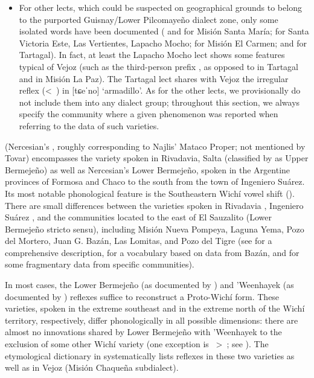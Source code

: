 \begin{itemize}
    \item For other lects, which could be suspected on geographical grounds to belong to the purported Guisnay/Lower Pilcomayeño dialect zone, only some isolated words have been documented ( and  for Misión Santa María;  for Santa Victoria Este, Las Vertientes, Lapacho Mocho;  for Misión El Carmen;  and  for Tartagal). In fact, at least the Lapacho Mocho lect shows some features typical of Vejoz (such as the third-person prefix , as opposed to  in Tartagal and  in Misión La Paz). The Tartagal lect shares with Vejoz the irregular reflex  (<~) in [tɕeˈno] `armadillo'. As for the other lects, we provisionally do not include them into any dialect group; throughout this section, we always specify the community where a given phenomenon was reported when referring to the data of such varieties.
\end{itemize}

 (Nercesian’s , roughly corresponding to Najlis’ Mataco Proper; not mentioned by Tovar) encompasses the variety spoken in Rivadavia, Salta (classified by  as Upper Bermejeño) as well as Nercesian’s Lower Bermejeño, spoken in the Argentine provinces of Formosa and Chaco to the south from the town of Ingeniero Suárez. Its most notable phonological feature is the Southeastern Wichí vowel shift (). There are small differences between the varieties spoken in Rivadavia \citep{JT09-th}, Ingeniero Suárez \citep{LCB-MBC09,LCB15}, and the communities located to the east of El Sauzalito (Lower Bermejeño stricto sensu), including Misión Nueva Pompeya, Laguna Yema, Pozo del Mortero, Juan G. Bazán, Las Lomitas, and Pozo del Tigre (see  for a comprehensive description,  for a vocabulary based on data from Bazán, and  for some fragmentary data from specific communities).

In most cases, the Lower Bermejeño (as documented by ) and ’Weenhayek (as documented by ) reflexes suffice to reconstruct a Proto-Wichí form. These varieties, spoken in the extreme southeast and in the extreme north of the Wichí territory, respectively, differ phonologically in all possible dimensions: there are almost no innovations shared by Lower Bermejeño with ’Weenhayek to the exclusion of some other Wichí variety (one exception is ~>~; see ). The etymological dictionary in  systematically lists reflexes in these two varieties as well as in Vejoz (Misión Chaqueña subdialect).

